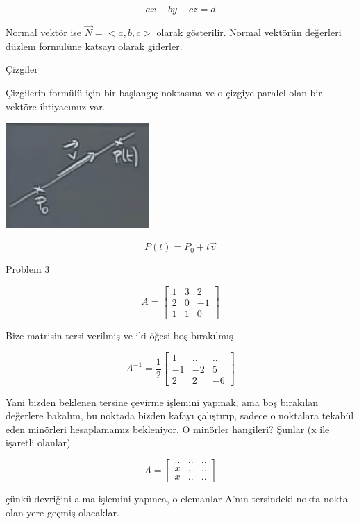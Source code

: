 \documentclass[12pt,fleqn]{article}\usepackage{../../common}
\begin{document}
$$ ax + by + cz  = d $$

Normal vektör ise $\vec{N} = <a,b,c>$ olarak gösterilir. Normal vektörün
değerleri düzlem formülüne katsayı olarak giderler. 

Çizgiler

Çizgilerin formülü için bir başlangıç noktasına ve o çizgiye paralel olan
bir vektöre ihtiyacımız var. 

\begin{center}


\includegraphics[height=4cm]{7_2.png}


\end{center}
$$ P(t) = P_0 + t \vec{v} $$

Problem 3

$$ A = 
\left[\begin{array}{rrr}
1 & 3 & 2 \\
2 & 0 & -1 \\
1 & 1 & 0
\end{array}\right]
 $$

Bize matrisin tersi verilmiş ve iki öğesi boş bırakılmış

$$ A^{-1} = \frac{1}{2}
\left[\begin{array}{rrr}
1 & .. & .. \\
-1 & -2 & 5 \\
2 & 2 & -6
\end{array}\right]
 $$

Yani bizden beklenen tersine çevirme işlemini yapmak, ama boş bırakılan
değerlere bakalım, bu noktada bizden kafayı çalıştırıp, sadece o noktalara 
tekabül 
eden minörleri hesaplamamız bekleniyor. O minörler hangileri? Şunlar (x ile
işaretli olanlar). 

$$ A = 
\left[\begin{array}{rrr}
.. & .. & ..\\
x & .. & ..\\
x & .. & ..
\end{array}\right]
 $$

çünkü devriğini alma işlemini yapınca, o elemanlar A'nın tersindeki nokta nokta 
olan
yere geçmiş olacaklar. 
\end{document}
